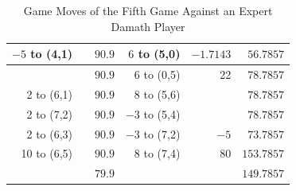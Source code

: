 \begin{appendices}
\begin{table}[H]
\begin{tabular}{rrrrrr}
        $-5$ to (4,1) &    &  $90.9$  & $6$ to (5,0)      & $-1.7143$  &  $56.7857$    \\ \hline
                      &    &  $90.9$  & $6$ to (0,5)      & 22  &  $78.7857$    \\ \hline
          2 to (6,1) &    &  $90.9$  & $8$ to (5,6)      &   &  $78.7857$    \\ \hline
          2 to (7,2) &    &  $90.9$  & $-3$ to (5,4)      &   &  $78.7857$    \\ \hline
          2 to (6,3) &    &  $90.9$  & $-3$ to (7,2)      & $-5$   &  $73.7857$    \\ \hline
          10 to (6,5) &    &  $90.9$  & $8$ to (7,4)      & $80$   &  $153.7857$    \\ \hline\hline
                      &    &  $79.9$  &                   &        &  $149.7857$    \\ \hline
    \end{tabular}
    \caption{Game Moves of the Fifth Game Against an Expert Damath Player}
    \label{tab:fifth-game}
\end{table}


\end{appendices}
